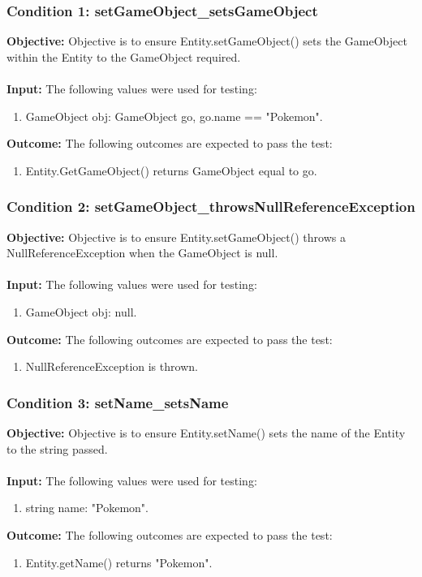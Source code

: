 \documentclass[a4paper,12pt]{article}
\begin{document}
		\subsubsection{Condition 1: setGameObject\_setsGameObject}
			\textbf{Objective:} Objective is to ensure Entity.setGameObject() sets the GameObject within the Entity to the GameObject required.\\\\
			\textbf{Input:} The following values were used for testing:
				\begin{enumerate}
					\item GameObject obj: GameObject go, go.name == "Pokemon".
				\end{enumerate}
			\textbf{Outcome:} The following outcomes are expected to pass the test:
				\begin{enumerate}
					\item Entity.GetGameObject() returns GameObject equal to go.
				\end{enumerate}
		\subsubsection{Condition 2: setGameObject\_throwsNullReferenceException}
			\textbf{Objective:} Objective is to ensure Entity.setGameObject() throws a NullReferenceException when the GameObject is null.\\\\
			\textbf{Input:} The following values were used for testing:
				\begin{enumerate}
					\item GameObject obj: null.
				\end{enumerate}
			\textbf{Outcome:} The following outcomes are expected to pass the test:
				\begin{enumerate}
					\item NullReferenceException is thrown.
				\end{enumerate}
		\subsubsection{Condition 3: setName\_setsName}
			\textbf{Objective:} Objective is to ensure Entity.setName() sets the name of the Entity to the string passed.\\\\
			\textbf{Input:} The following values were used for testing:
				\begin{enumerate}
					\item string name: "Pokemon".
				\end{enumerate}
			\textbf{Outcome:} The following outcomes are expected to pass the test:
				\begin{enumerate}
					\item Entity.getName() returns "Pokemon".
				\end{enumerate}
\end{document}
